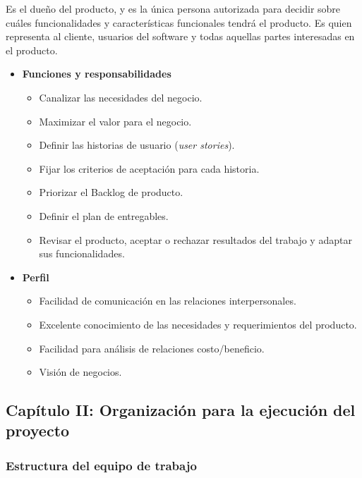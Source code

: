        Es el dueño del producto, y es la única persona autorizada para decidir sobre cuáles funcionalidades y características funcionales tendrá el producto.
        Es quien representa al cliente, usuarios del software y todas aquellas partes interesadas en el producto.
        	\begin{itemize}
			\item \textbf{Funciones y responsabilidades}
            	\begin{itemize}
				\item Canalizar las necesidades del negocio.
                \item Maximizar el valor para el negocio.
                \item Definir las historias de usuario (\textit{user stories}).
                \item Fijar los criterios de aceptación para cada historia.
                \item Priorizar el Backlog de producto.
                \item Definir el plan de entregables.
                \item Revisar el producto, aceptar o rechazar resultados del trabajo y adaptar sus funcionalidades.
				\end{itemize}
             
            \item \textbf{Perfil}
            	\begin{itemize}
				\item Facilidad de comunicación en las relaciones interpersonales.
                \item Excelente conocimiento de las necesidades y requerimientos del producto.
                \item Facilidad para análisis de relaciones costo/beneficio.
                \item Visión de negocios.
				\end{itemize}
                
			\end{itemize}


\subsection{Capítulo II: Organización para la ejecución del proyecto}
\subsubsection{Estructura del equipo de trabajo}

